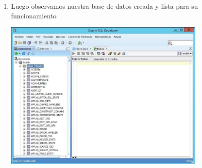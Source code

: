 \begin{enumerate}[1.]
	\hfill \break
	\hfill \break
	\hfill \break
	\hfill \break
	\hfill \break
	\hfill \break
	\hfill \break
	\item Luego observamos nuestra base de datos creada y lista para su funcionamiento\\
	\begin{center}
	\includegraphics[width=10cm]{./Imagenes/img28} 
	\end{center}


\end{enumerate} 

